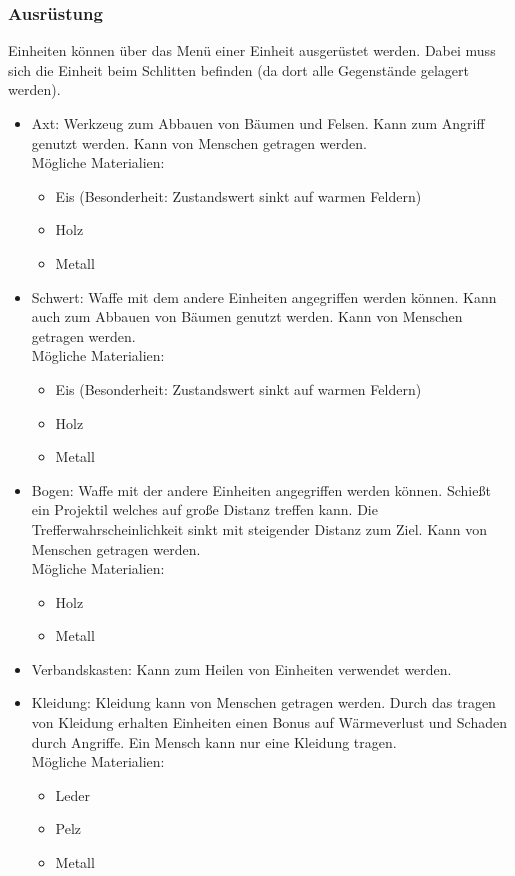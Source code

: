 \documentclass[a4paper,
  twoside, %
  headlines=2.1 %
  ]{scrartcl}
\begin{document}
			\subsubsection {Ausrüstung}
			 Einheiten können über das Menü einer Einheit ausgerüstet werden. Dabei 
				muss sich die Einheit beim Schlitten befinden (da dort alle Gegenstände 
				gelagert werden).
			    \begin{itemize}
			        \item Axt:
					Werkzeug zum Abbauen von Bäumen und Felsen. 
					Kann zum Angriff genutzt werden. 
					Kann von Menschen getragen werden.
					 \\
					Mögliche Materialien:
					\begin{itemize}
						\item Eis (Besonderheit: Zustandswert sinkt auf warmen Feldern)
						\item Holz
						\item Metall
					\end{itemize}
					
				    \item Schwert:
					Waffe mit dem andere Einheiten angegriffen werden können. 
					Kann auch zum Abbauen von Bäumen genutzt werden. 
					Kann von Menschen getragen werden. \\
					Mögliche Materialien:
					\begin{itemize}
						\item Eis (Besonderheit: Zustandswert sinkt auf warmen Feldern)
						\item Holz
						\item Metall
					\end{itemize}
					
				    \item Bogen:
					Waffe mit der andere Einheiten angegriffen werden können. Schießt ein Projektil welches auf große Distanz treffen kann. 
					Die Trefferwahrscheinlichkeit sinkt mit steigender Distanz zum Ziel. Kann von Menschen getragen werden. \\
					Mögliche Materialien:
					\begin{itemize}
						\item Holz
						\item Metall
					\end{itemize}
					
				    \item Verbandskasten: Kann zum Heilen von Einheiten verwendet werden.
				    
				    \item Kleidung:
					Kleidung kann von Menschen getragen werden. Durch das tragen von Kleidung erhalten Einheiten einen Bonus auf Wärmeverlust und Schaden durch Angriffe. Ein Mensch kann nur eine Kleidung tragen.\\
					Mögliche Materialien:
					\begin{itemize}
					    \item Leder
					    \item Pelz
					    \item Metall
					\end{itemize}
				\end{itemize}
\end{document}
